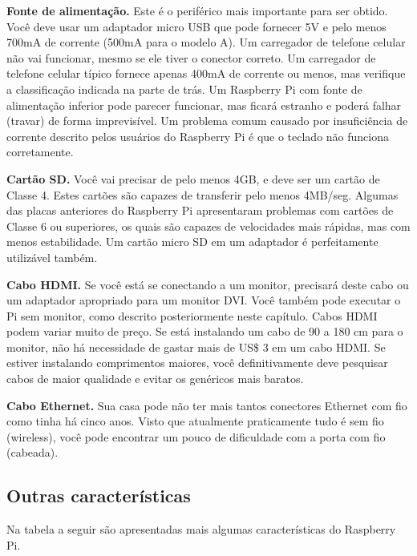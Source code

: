 \textbf{Fonte de alimentação.} Este é o periférico mais importante para ser obtido. Você deve usar um adaptador micro USB que pode fornecer 5V e pelo menos 700mA de corrente (500mA para o modelo A). Um carregador de telefone celular não vai funcionar, mesmo se ele tiver o conector correto. Um carregador de telefone celular típico fornece apenas 400mA de corrente ou menos, mas verifique a classificação indicada na parte de trás. Um Raspberry Pi com fonte de alimentação inferior pode parecer funcionar, mas ficará estranho e poderá falhar (travar) de forma imprevisível. Um problema comum causado por insuficiência de corrente descrito pelos usuários do Raspberry Pi é que o teclado não funciona corretamente.

\textbf{Cartão SD.} Você vai precisar de pelo menos 4GB, e deve ser um cartão de Classe 4. Estes cartões são capazes de transferir pelo menos 4MB/seg. Algumas das placas anteriores do Raspberry Pi apresentaram problemas com cartões de Classe 6 ou superiores, os quais são capazes de velocidades mais rápidas, mas com menos estabilidade. Um cartão micro SD em um adaptador é perfeitamente utilizável também.

\textbf{Cabo HDMI.} Se você está se conectando a um monitor, precisará deste cabo ou um adaptador apropriado para um monitor DVI. Você também pode executar o Pi sem monitor, como descrito posteriormente neste capítulo. Cabos HDMI podem variar muito de preço. Se está instalando um cabo de 90 a 180 cm para o monitor, não há necessidade de gastar mais de US\$ 3 em um cabo HDMI. Se estiver instalando comprimentos maiores, você definitivamente deve pesquisar cabos de maior qualidade e evitar os genéricos mais baratos.

\textbf{Cabo Ethernet.} Sua casa pode não ter mais tantos conectores Ethernet com fio como tinha há cinco anos. Visto que atualmente praticamente tudo é sem fio (wireless), você pode encontrar um pouco de dificuldade com a porta com fio (cabeada).

\newpage

\subsection{Outras características}

Na tabela a seguir são apresentadas mais algumas características do Raspberry Pi.

